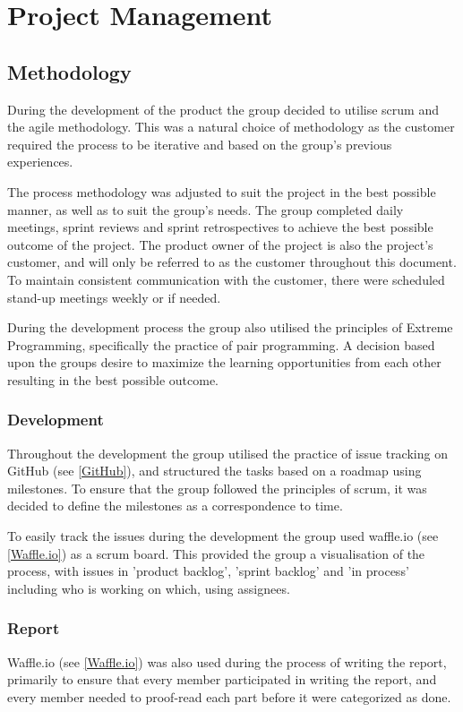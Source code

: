 
\chapter{Project Management}

\section{Methodology}
\label{methodology}
During the development of the product the group decided to utilise scrum and the agile methodology. This was a natural choice of methodology as the customer required the process to be iterative and based on the group's previous experiences.

The process methodology was adjusted to suit the project in the best possible manner, as well as to suit the group's needs. The group completed daily meetings, sprint reviews and sprint retrospectives to achieve the best possible outcome of the project. The product owner of the project is also the project's customer, and will only be referred to as the customer throughout this document. To maintain consistent communication with the customer, there were scheduled stand-up meetings weekly or if needed. 

During the development process the group also utilised the principles of Extreme Programming, specifically the practice of pair programming. A decision based upon the groups desire to maximize the learning opportunities from each other resulting in the best possible outcome. 

\subsection{Development}
Throughout the development the group utilised the practice of issue tracking on GitHub (see \ref{GitHub}), and structured the tasks based on a roadmap using milestones. To ensure that the group followed the principles of scrum, it was decided to define the milestones as a correspondence to time.

To easily track the issues during the development the group used waffle.io (see \ref{Waffle.io}) as a scrum board. This provided the group a visualisation of the process, with issues in 'product backlog', 'sprint backlog' and 'in process' including who is working on which, using assignees. 

\subsection{Report}
Waffle.io (see \ref{Waffle.io}) was also used during the process of writing the report, primarily to ensure that every member participated in writing the report, and every member needed to proof-read each part before it were categorized as done.

